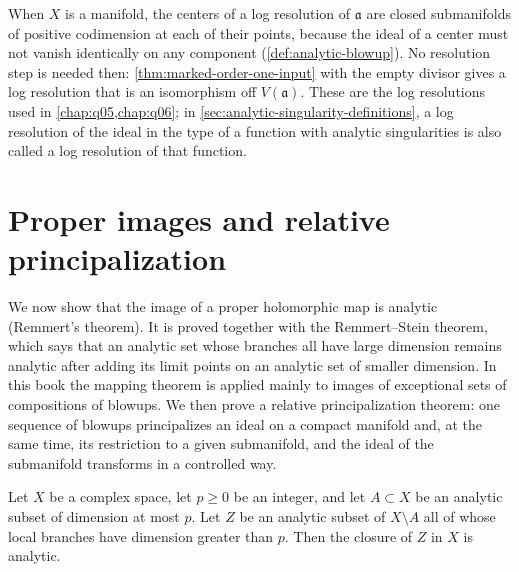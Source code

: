 When $X$ is a manifold, the centers of a log resolution of $\mathfrak a$ are closed submanifolds of positive codimension at each of their points, because the ideal of a center must not vanish identically on any component (\cref{def:analytic-blowup}). No resolution step is needed then: \cref{thm:marked-order-one-input} with the empty divisor gives a log resolution that is an isomorphism off $V(\mathfrak a)$. These are the log resolutions used in \cref{chap:q05,chap:q06}; in \cref{sec:analytic-singularity-definitions}, a log resolution of the ideal in the type of a function with analytic singularities is also called a log resolution of that function.

\section{Proper images and relative principalization}\label{sec:proper-images-relative-principalization}

We now show that the image of a proper holomorphic map is analytic (Remmert's theorem). It is proved together with the Remmert--Stein theorem, which says that an analytic set whose branches all have large dimension remains analytic after adding its limit points on an analytic set of smaller dimension. In this book the mapping theorem is applied mainly to images of exceptional sets of compositions of blowups. We then prove a relative principalization theorem: one sequence of blowups principalizes an ideal on a compact manifold and, at the same time, its restriction to a given submanifold, and the ideal of the submanifold transforms in a controlled way.

\begin{theorem}\label{thm:remmert-stein-extension}
Let $X$ be a complex space, let $p\geq0$ be an integer, and let $A\subset X$ be an analytic subset of dimension at most $p$. Let $Z$ be an analytic subset of $X\setminus A$ all of whose local branches have dimension greater than $p$. Then the closure of $Z$ in $X$ is analytic.
\end{theorem}

